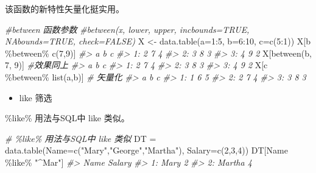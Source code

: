 \documentclass[
]{book}
\newenvironment{Shaded}{\begin{snugshade}}{\end{snugshade}}
\newcommand{\AttributeTok}[1]{\textcolor[rgb]{0.77,0.63,0.00}{#1}}
\newcommand{\CommentTok}[1]{\textcolor[rgb]{0.56,0.35,0.01}{\textit{#1}}}
\newcommand{\DecValTok}[1]{\textcolor[rgb]{0.00,0.00,0.81}{#1}}
\newcommand{\FunctionTok}[1]{\textcolor[rgb]{0.00,0.00,0.00}{#1}}
\newcommand{\NormalTok}[1]{#1}
\newcommand{\OtherTok}[1]{\textcolor[rgb]{0.56,0.35,0.01}{#1}}
\newcommand{\SpecialCharTok}[1]{\textcolor[rgb]{0.00,0.00,0.00}{#1}}
\newcommand{\StringTok}[1]{\textcolor[rgb]{0.31,0.60,0.02}{#1}}
\providecommand{\tightlist}{%
  \setlength{\itemsep}{0pt}\setlength{\parskip}{0pt}}
\begin{document}
该函数的新特性矢量化挺实用。

\begin{Shaded}
\begin{Highlighting}[]
\CommentTok{\#between 函数参数}
\CommentTok{\#between(x, lower, upper, incbounds=TRUE, NAbounds=TRUE, check=FALSE)}
\NormalTok{X }\OtherTok{\textless{}{-}}  \FunctionTok{data.table}\NormalTok{(}\AttributeTok{a=}\DecValTok{1}\SpecialCharTok{:}\DecValTok{5}\NormalTok{, }\AttributeTok{b=}\DecValTok{6}\SpecialCharTok{:}\DecValTok{10}\NormalTok{, }\AttributeTok{c=}\FunctionTok{c}\NormalTok{(}\DecValTok{5}\SpecialCharTok{:}\DecValTok{1}\NormalTok{))}
\NormalTok{X[b }\SpecialCharTok{\%between\%} \FunctionTok{c}\NormalTok{(}\DecValTok{7}\NormalTok{,}\DecValTok{9}\NormalTok{)]}
\CommentTok{\#\textgreater{}    a b c}
\CommentTok{\#\textgreater{} 1: 2 7 4}
\CommentTok{\#\textgreater{} 2: 3 8 3}
\CommentTok{\#\textgreater{} 3: 4 9 2}
\NormalTok{X[}\FunctionTok{between}\NormalTok{(b, }\DecValTok{7}\NormalTok{, }\DecValTok{9}\NormalTok{)] }\CommentTok{\#效果同上}
\CommentTok{\#\textgreater{}    a b c}
\CommentTok{\#\textgreater{} 1: 2 7 4}
\CommentTok{\#\textgreater{} 2: 3 8 3}
\CommentTok{\#\textgreater{} 3: 4 9 2}
\NormalTok{X[c }\SpecialCharTok{\%between\%} \FunctionTok{list}\NormalTok{(a,b)] }\CommentTok{\# 矢量化}
\CommentTok{\#\textgreater{}    a b c}
\CommentTok{\#\textgreater{} 1: 1 6 5}
\CommentTok{\#\textgreater{} 2: 2 7 4}
\CommentTok{\#\textgreater{} 3: 3 8 3}
\end{Highlighting}
\end{Shaded}

\begin{itemize}
\tightlist
\item
  like 筛选
\end{itemize}

\%like\% 用法与SQL中 like 类似。

\begin{Shaded}
\begin{Highlighting}[]
\CommentTok{\# \%like\% 用法与SQL中 like 类似}
\NormalTok{DT }\OtherTok{=} \FunctionTok{data.table}\NormalTok{(}\AttributeTok{Name=}\FunctionTok{c}\NormalTok{(}\StringTok{"Mary"}\NormalTok{,}\StringTok{"George"}\NormalTok{,}\StringTok{"Martha"}\NormalTok{), }\AttributeTok{Salary=}\FunctionTok{c}\NormalTok{(}\DecValTok{2}\NormalTok{,}\DecValTok{3}\NormalTok{,}\DecValTok{4}\NormalTok{))}
\NormalTok{DT[Name }\SpecialCharTok{\%like\%} \StringTok{"\^{}Mar"}\NormalTok{]}
\CommentTok{\#\textgreater{}      Name Salary}
\CommentTok{\#\textgreater{} 1:   Mary      2}
\CommentTok{\#\textgreater{} 2: Martha      4}
\end{Highlighting}
\end{Shaded}
\end{document}
